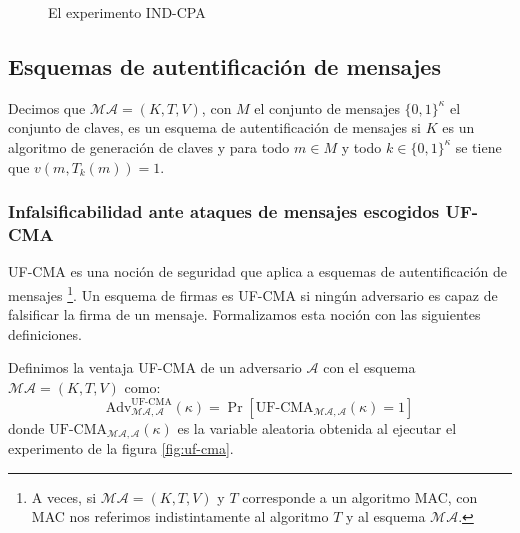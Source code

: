 \begin{figure}
\begin{centering}
\end{centering}
\caption{El experimento IND-CPA}
\label{fig:ind_cpa}
\end{figure}

\subsection{Esquemas de autentificación de mensajes}
\label{sect:uf-cma}
Decimos que $\mathcal{MA}=(K,T,V)$, con $M$ el conjunto de mensajes $\{0,1\}^\kappa$ el conjunto de claves,
es un esquema de autentificación de
mensajes si $K$ es un algoritmo de generación de claves y para todo $m \in M$ y todo
$k \in \{0,1\}^\kappa$ se tiene que $v(m, T_k(m)) = 1$.

\subsubsection{Infalsificabilidad ante ataques de mensajes escogidos UF-CMA}
UF-CMA es una noción de seguridad que aplica a esquemas de autentificación de mensajes
\footnote{A veces, si $\mathcal{MA} = (K, T, V)$ y $T$ corresponde a un algoritmo MAC,
con MAC nos referimos indistintamente al algoritmo $T$ y al esquema $\mathcal{MA}$.}.
Un esquema de firmas
es UF-CMA si ningún adversario es capaz de falsificar la firma de un mensaje. Formalizamos esta noción
con las siguientes definiciones.

\begin{definicion}
Definimos la ventaja \textrm{UF-CMA} de un adversario $\mathcal{A}$ con el esquema $\mathcal{MA} = (K, T, V)$
como:
$$\mathrm{Adv}^\text{UF-CMA}_{\mathcal{MA},\mathcal{A}}(\kappa) =
\Pr[\text{UF-CMA}_{\mathcal{MA},\mathcal{A}}(\kappa) = 1]$$
donde $\text{UF-CMA}_{\mathcal{MA},\mathcal{A}}(\kappa)$ es la variable aleatoria obtenida al
ejecutar el experimento de la figura \ref{fig:uf-cma}.
\end{definicion}

